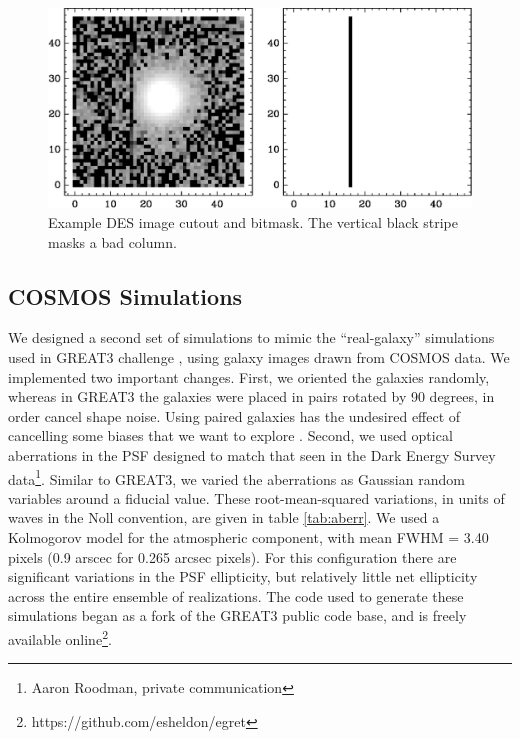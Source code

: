 \documentclass[usegraphicx,usenatbib]{mn2e}
\begin{document}
\begin{figure}
    \centering
    \includegraphics[scale=0.45]{DES2117+0126-bmask-021223.eps}

    \caption{Example DES image cutout and bitmask.  The vertical black stripe masks a
bad column. }

\label{fig:mask}
\end{figure}


\subsection{COSMOS Simulations}

We designed a second set of simulations to mimic the ``real-galaxy''
simulations used in GREAT3 challenge \citep{great3}, using galaxy images drawn
from COSMOS data.  We implemented two important changes.  First, we oriented
the galaxies randomly, whereas in GREAT3 the galaxies were placed in pairs
rotated by 90 degrees, in order cancel shape noise.  Using paired galaxies has
the undesired effect of cancelling some biases that we want to
explore \citep{DESSVShear}.  Second, we used optical aberrations in the PSF
designed to match that seen in the Dark Energy Survey data\footnote{Aaron
Roodman, private communication}.  Similar to GREAT3, we varied the aberrations
as Gaussian random variables around a fiducial value. These root-mean-squared variations, in
units of waves in the Noll convention, are given in table \ref{tab:aberr}.  We
used a Kolmogorov model for the atmospheric component, with mean FWHM = 3.40
pixels (0.9 arscec for 0.265 arcsec pixels).  For this configuration there are
significant variations in the PSF ellipticity, but relatively little net
ellipticity across the entire ensemble of realizations.  The code used to
generate these simulations began as a fork of the GREAT3 public code base, and
is freely available online\footnote{https://github.com/esheldon/egret}.
\end{document}
